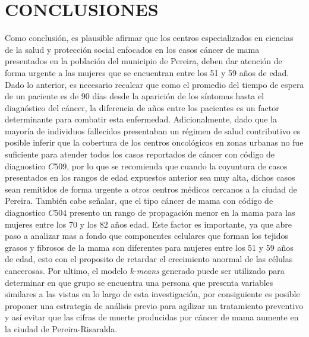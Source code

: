\section{CONCLUSIONES}
Como conclusión, es plausible afirmar que los centros especializados en ciencias de la salud y protección social enfocados en los casos cáncer de mama presentados en la población del municipio de Pereira, deben dar atención de forma urgente a las mujeres que se encuentran entre los 51 y 59 años de edad. Dado lo anterior, es necesario recalcar que como el promedio del tiempo de espera de un paciente es de 90 días desde la aparición de los síntomas hasta el diagnóstico del cáncer, la diferencia de años entre los pacientes es un factor determinante para combatir esta enfermedad. Adicionalmente, dado que la mayoría de individuos fallecidos presentaban un régimen de salud contributivo es posible inferir que la cobertura de los centros oncológicos en zonas urbanas no fue suficiente para atender todos los casos reportados de cáncer con código de diagnostico $C509$, por lo que se recomienda que cuando la coyuntura de casos presentados en los rangos de edad expuestos anterior sea muy alta, dichos casos sean remitidos de forma urgente a otros centros médicos cercanos a la ciudad de Pereira. También cabe señalar, que el tipo cáncer de mama con código de diagnostico $C504$ presento un rango de propagación menor en la mama para las mujeres entre los 70 y los 82 años edad. Este factor es importante, ya que abre paso a analizar mas a fondo que componentes celulares que forman los tejidos grasos y fibrosos de la mama son diferentes para mujeres entre los 51 y 59 años de edad, esto con el proposito de retardar el crecimiento anormal de las células cancerosas. Por ultimo, el modelo \textit{k-means} generado puede ser utilizado para determinar en que grupo se encuentra una persona que presenta variables similares a las vistas en lo largo de esta investigación, por consiguiente es posible proponer una estrategia de análisis previo para agilizar un tratamiento preventivo y así evitar que las cifras de muerte producidas por cáncer de mama aumente en la ciudad de Pereira-Risaralda.
